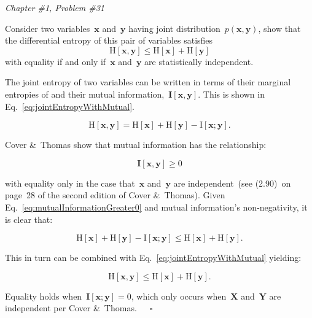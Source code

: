 \documentclass{report}
\newcounter{subProbCount}       %
\newenvironment{problemshell}{
  \par%
  \medskip
  \leftskip=0pt\rightskip=0pt%
}
{
  \par\medskip
  \setcounter{subProbCount}{1} %
}
\newenvironment{problem}[2]
{%
  \begin{problemshell}
    \noindent \textit{Chapter \##1, Problem \##2} \\
    \bfseries  
}
{
  \end{problemshell}
}
\begin{document}
  
  \newpage
  \begin{problem}{1}{31}
    Consider two variables~$\mathbf{x}$ and~$\mathbf{y}$ having joint distribution~$p(\mathbf{x},\mathbf{y})$, show that the differential entropy of this pair of variables satisfies
    \[\textrm{H}[\mathbf{x},\mathbf{y}] \leq \textrm{H}[\mathbf{x}] + \textrm{H}[\mathbf{y}]\]
    with equality if and only if~$\mathbf{x}$ and~$\mathbf{y}$ are statistically independent.
  \end{problem}

  The joint entropy of two variables can be written in terms of their marginal entropies of and their mutual information,~$\mathbf{I}[\mathbf{x},\mathbf{y}]$.  This is shown in Eq.~\eqref{eq:jointEntropyWithMutual}.
  
  \begin{equation}
    \textrm{H}[\mathbf{x},\mathbf{y}] = \textrm{H}[\mathbf{x}] + \textrm{H}[\mathbf{y}] - \textrm{I}[\mathbf{x};\mathbf{y}] \textrm{.}
    \label{eq:jointEntropyWithMutual}
  \end{equation}
  
  Cover \&~Thomas show that mutual information has the relationship:
  
  \begin{equation}
    \mathbf{I}[\mathbf{x},\mathbf{y}] \geq 0
    \label{eq:mutualInformationGreater0}
  \end{equation}
  
  \noindent
  with equality only in the case that~$\mathbf{x}$ and~$\mathbf{y}$ are independent~(see (2.90)~on page~28 of the second edition of Cover \&~Thomas).  Given Eq.~\eqref{eq:mutualInformationGreater0} and mutual information's non-negativity, it is clear that:
  
  \[ \textrm{H}[\mathbf{x}] + \textrm{H}[\mathbf{y}] - \textrm{I}[\mathbf{x};\mathbf{y}] \leq \textrm{H}[\mathbf{x}] + \textrm{H}[\mathbf{y}] \textrm{.} \]
  
  This in turn can be combined with Eq.~\eqref{eq:jointEntropyWithMutual} yielding:
  
  \begin{equation}
    \textrm{H}[\mathbf{x},\mathbf{y}] \leq \textrm{H}[\mathbf{x}] + \textrm{H}[\mathbf{y}] \textrm{.}
  \end{equation}
  
  Equality holds when~$\mathbf{I}[\mathbf{x};\mathbf{y}]=0$, which only occurs when~$\mathbf{X}$ and~$\mathbf{Y}$ are independent per Cover \&~Thomas.~~~$\square$
  
\end{document}
